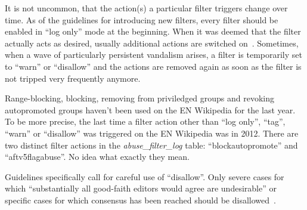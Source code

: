 \documentclass{sigchi}
\begin{document}
It is not uncommon, that the action(s) a particular filter triggers change over time.
As of the guidelines for introducing new filters, every filter should be enabled in ``log only'' mode at the beginning.
When it was deemed that the filter actually acts as desired, usually additional actions are switched on~\cite{Wikipedia:EditFilterInstructions}.
Sometimes, when a wave of particularly persistent vandalism arises, a filter is temporarily set to ``warn'' or ``disallow'' and the actions are removed again as soon as the filter is not tripped very frequently anymore. %

Range-blocking, blocking, removing from priviledged groups and revoking autopromoted groups haven't been used on the EN Wikipedia for the last year. %
To be more precise, the last time a filter action other than ``log only'', ``tag'', ``warn'' or ``disallow'' was triggered on the EN Wikipedia was in 2012.
There are two distinct filter actions in the \emph{abuse\_filter\_log} table: ``blockautopromote'' and ``aftv5flagabuse''.
No idea what exactly they mean.

Guidelines specifically call for careful use of ``disallow''.
Only severe cases for which ``substantially all good-faith editors would agree are undesirable'' or specific cases for which consensus has been reached should be disallowed~\cite{Wikipedia:EditFilter}.
\end{document}
